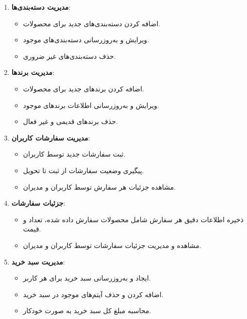 \documentclass[12pt]{article}
\begin{document}
\begin{enumerate}
    \item \textbf{مدیریت دسته‌بندی‌ها}:
    \begin{itemize}
        \item اضافه کردن دسته‌بندی‌های جدید برای محصولات.
        \item ویرایش و به‌روزرسانی دسته‌بندی‌های موجود.
        \item حذف دسته‌بندی‌های غیر ضروری.
    \end{itemize}
    \vspace{0.3cm}
    
    \item \textbf{مدیریت برندها}:
    \begin{itemize}
        \item اضافه کردن برندهای جدید برای محصولات.
        \item ویرایش و به‌روزرسانی اطلاعات برندهای موجود.
        \item حذف برندهای قدیمی و غیر فعال.
    \end{itemize}
    \vspace{0.3cm}
    
    \item \textbf{مدیریت سفارشات کاربران}:
    \begin{itemize}
        \item ثبت سفارشات جدید توسط کاربران.
        \item پیگیری وضعیت سفارشات از ثبت تا تحویل.
        \item مشاهده جزئیات هر سفارش توسط کاربران و مدیران.
    \end{itemize}
    \vspace{0.3cm}
    
    \item \textbf{جزئیات سفارشات}:
    \begin{itemize}
        \item ذخیره اطلاعات دقیق هر سفارش شامل محصولات سفارش داده شده، تعداد و قیمت.
        \item مشاهده و مدیریت جزئیات سفارشات توسط کاربران و مدیران.
    \end{itemize}
    \vspace{0.3cm}
    
    \item \textbf{مدیریت سبد خرید}:
    \begin{itemize}
        \item ایجاد و به‌روزرسانی سبد خرید برای هر کاربر.
        \item اضافه کردن و حذف آیتم‌های موجود در سبد خرید.
        \item محاسبه مبلغ کل سبد خرید به صورت خودکار.
    \end{itemize}
    \vspace{0.3cm}
    

\end{enumerate}
\end{document}
